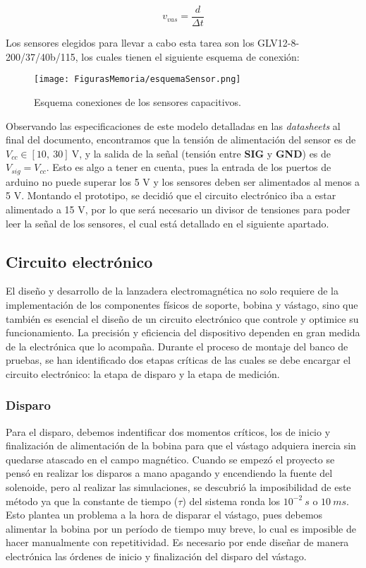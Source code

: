 \[v_{vas}=\frac{d}{\Delta t}\]

Los sensores elegidos para llevar a cabo esta tarea son los GLV12-8-200/37/40b/115, los cuales tienen el siguiente esquema de conexión:

\begin{figure}[H]
    \centering
    \texttt{[image: FigurasMemoria/esquemaSensor.png]}
    \caption{Esquema conexiones de los sensores capacitivos.}
    \label{fig:esquemaSensor} %
\end{figure}

Observando las especificaciones de este modelo detalladas en las \textit{datasheets} al final del documento, encontramos que la tensión de alimentación del sensor es de \(V_{cc}\in [10,~30]~\text{V}\), y la salida de la señal (tensión entre \textbf{SIG} y \textbf{GND}) es de \(V_{sig}=V_{cc}\). Esto es algo a tener en cuenta, pues la entrada de los puertos de arduino no puede superar los 5 V y los sensores deben ser alimentados al menos a 5 V. Montando el prototipo, se decidió que el circuito electrónico iba a estar alimentado a 15 V, por lo que será necesario un divisor de tensiones para poder leer la señal de los sensores, el cual está detallado en el siguiente apartado.

\subsection{Circuito electrónico}
\label{subsec:circuito}
El diseño y desarrollo de la lanzadera electromagnética no solo requiere de la implementación de los componentes físicos de soporte, bobina y vástago, sino que también es esencial el diseño de un circuito electrónico que controle y optimice su funcionamiento. La precisión y eficiencia del dispositivo dependen en gran medida de la electrónica que lo acompaña. Durante el proceso de montaje del banco de pruebas, se han identificado dos etapas críticas de las cuales se debe encargar el circuito electrónico: la etapa de disparo y la etapa de medición.

\subsubsection*{Disparo}

Para el disparo, debemos indentificar dos momentos críticos, los de inicio y finalización de alimentación de la bobina para que el vástago adquiera inercia sin quedarse atascado en el campo magnético. Cuando se empezó el proyecto se pensó en realizar los disparos a mano apagando y encendiendo la fuente del solenoide, pero al realizar las simulaciones, se descubrió la imposibilidad de este método ya que la constante de tiempo (\(\tau\)) del sistema ronda los \(10^{-2}~s\) o \(10~ms\). Esto plantea un problema a la hora de disparar el vástago, pues debemos alimentar la bobina por un período de tiempo muy breve, lo cual es imposible de hacer manualmente con repetitividad. Es necesario por ende diseñar de manera electrónica las órdenes de inicio y finalización del disparo del vástago.

